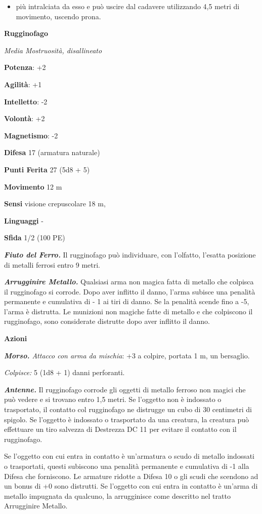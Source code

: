 \begin{multicols}{2}
\begin{itemize}
\item
  più intralciata da esso e può uscire dal cadavere utilizzando 4,5
  metri di movimento, uscendo prona.
\end{itemize}

\textbf{Rugginofago}

\emph{Media Mostruosità, disallineato}

\textbf{Potenza}: +2

\textbf{Agilità}: +1

\textbf{Intelletto}: -2

\textbf{Volontà}: +2

\textbf{Magnetismo}: -2

\textbf{Difesa} 17 (armatura naturale)

\textbf{Punti Ferita} 27 (5d8 + 5)

\textbf{Movimento} 12 m

\textbf{Sensi} visione crepuscolare 18 m, 

\textbf{Linguaggi} -

\textbf{Sfida} 1/2 (100 PE)\smallskip

\emph{\textbf{Fiuto del Ferro.}} Il rugginofago può individuare, con
l'olfatto, l'esatta posizione di metalli ferrosi entro 9 metri.

\emph{\textbf{Arrugginire Metallo.}} Qualsiasi arma non magica fatta di
metallo che colpisca il rugginofago si corrode. Dopo aver inflitto il
danno, l'arma subisce una penalità permanente e cumulativa di - 1 ai
tiri di danno. Se la penalità scende fino a -5, l'arma è distrutta. Le
munizioni non magiche fatte di metallo e che colpiscono il rugginofago,
sono considerate distrutte dopo aver inflitto il danno.

\smallskip\textbf{Azioni}

\emph{\textbf{Morso.} Attacco con arma da mischia}: +3 a colpire,
portata 1 m, un bersaglio.

\emph{Colpisce:} 5 (1d8 + 1) danni perforanti.

\emph{\textbf{Antenne.}} Il rugginofago corrode gli oggetti di metallo
ferroso non magici che può vedere e si trovano entro 1,5 metri. Se
l'oggetto non è indossato o trasportato, il contatto col rugginofago ne
distrugge un cubo di 30 centimetri di spigolo. Se l'oggetto è indossato
o trasportato da una creatura, la creatura può effettuare un tiro
salvezza di Destrezza DC 11 per evitare il contatto con il rugginofago.

Se l'oggetto con cui entra in contatto è un'armatura o scudo di metallo
indossati o trasportati, questi subiscono una penalità permanente e
cumulativa di -1 alla Difesa che forniscono. Le armature ridotte a Difesa 10 o
gli scudi che scendono ad un bonus di +0 sono distrutti. Se l'oggetto
con cui entra in contatto è un'arma di metallo impugnata da qualcuno, la
arrugginisce come descritto nel tratto Arrugginire Metallo.


\end{multicols}

